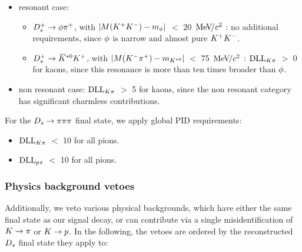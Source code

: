 \begin{itemize}
\item resonant case: 
\begin{itemize}
\item ${{D}^+_{s}}\rightarrow\phi{\ensuremath{{\pi}^+}}$, with $|M({{K}^+}{{K}^-}) - m_{\phi}|$ $<$ 20 ${\mathrm{\,Me\kern -0.1em V\!/}c^2}$ : no additional requirements, since $\phi$ is narrow and almost pure ${{K}^+}{{K}^-}$. 
\item ${{D}^+_{s}}\rightarrow{\ensuremath{{\kern 0.2em\overline{\kern -0.2em K}{}}{}^{*0}}}{\ensuremath{{K}^+}}$, with  $|M({{K}^-}{{\pi}^+}) -m_{{{K}^{*0}}}|$ $<$ 75 ${\mathrm{\,Me\kern -0.1em V\!/}c^2}$ :  $\mathrm{DLL}_{{K}{\pi}}$ $>$ 0 for kaons, since this resonance is more than ten times broader than $\phi$. 
\end{itemize}

\item non resonant case: $\mathrm{DLL}_{{K}{\pi}}$ $>$ 5 for kaons, since the non resonant category has significant charmless contributions.

\end{itemize}


For the ${{D}_{s}}\rightarrow{\ensuremath{\pi}}{\ensuremath{\pi}}{\ensuremath{\pi}}$ final state, we apply global PID requirements:

\begin{itemize}

\item $\mathrm{DLL}_{{K}{\pi}}$ $<$ 10 for all pions.

\item $\mathrm{DLL}_{{p}{\pi}}$ $<$ 10 for all pions.

\end{itemize}
 


\subsubsection{Physics background vetoes}

Additionally, we veto various physical backgrounds, which have either the same final state as our signal decay, or can contribute via a single misidentification of ${K}\rightarrow{\ensuremath{\pi}}$ or ${K}\rightarrow{\ensuremath{p}}$. 
In the following, the vetoes are ordered by the reconstructed ${{D}_{s}}$ final state they apply to: 


